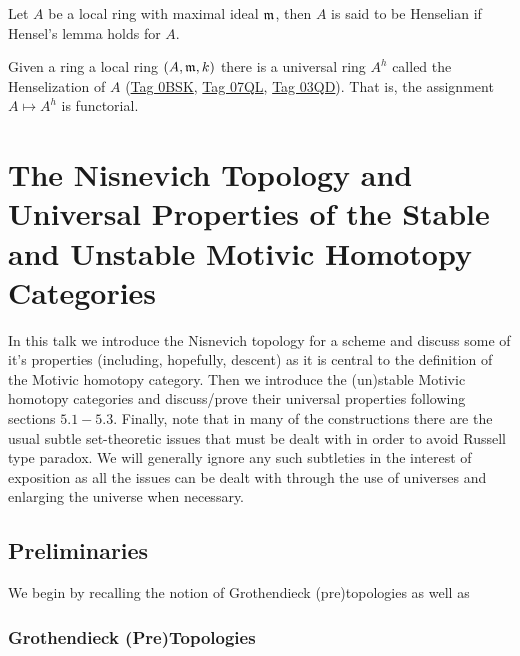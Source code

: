 \documentclass[12pt]{article}
\numberwithin{equation}{section}
\numberwithin{lemma}{section}
\numberwithin{theorem}{section}
\numberwithin{proposition}{section}
\numberwithin{corollary}{section}
\numberwithin{definition}{section}
\numberwithin{example}{section}
\numberwithin{remark}{section}
\begin{document}
\begin{definition}
  Let $A$ be a local ring with maximal ideal $\mathfrak{m}$, then $A$ is said
  to be Henselian if Hensel's lemma holds for $A$.
\end{definition}

Given a ring a local ring $(A, \mathfrak{m}, k)$ there is a universal ring
$A^{h}$ called the Henselization of $A$
(\href{https://stacks.math.columbia.edu/tag/0BSK}{Tag 0BSK},
\href{https://stacks.math.columbia.edu/tag/07QL}{Tag 07QL},
\href{https://stacks.math.columbia.edu/tag/03QD}{Tag 03QD}). That is,
the assignment $A \mapsto A^{h}$ is functorial.





\section{The Nisnevich Topology and Universal Properties of the Stable
  and Unstable Motivic Homotopy Categories}

In this talk we introduce the Nisnevich topology for a scheme and
discuss some of it's properties (including, hopefully, descent) as it
is central to the definition of the Motivic homotopy category. Then we
introduce the (un)stable Motivic homotopy categories and discuss/prove
their universal properties following~\cite{robalo2012noncommutative}
sections $5.1 - 5.3$. Finally, note that in many of the constructions
there are the usual subtle set-theoretic issues that must be dealt
with in order to avoid Russell type paradox. We will generally ignore
any such subtleties in the interest of exposition as all the issues
can be dealt with through the use of universes and enlarging the
universe when necessary.

\subsection{Preliminaries}

We begin by recalling the notion of Grothendieck (pre)topologies as
well as

\subsubsection*{Grothendieck (Pre)Topologies}
\end{document}
